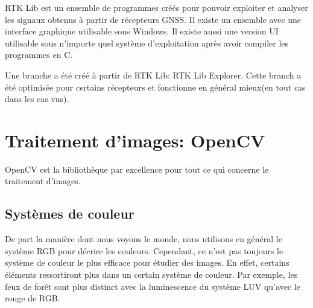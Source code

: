 \documentclass[a4paper, 11pt]{report}
\begin{document}
RTK Lib est un ensemble de programmes créés pour pouvoir exploiter et analyser les signaux obtenus à partir de récepteurs GNSS. Il existe un ensemble avec une interface graphique utilisable sous Windows. Il existe aussi une version UI utilisable sous n'importe quel système d'exploitation après avoir compiler les programmes en C.

Une branche a été créé à partir de RTK Lib: RTK Lib Explorer. Cette branch a été optimisée pour certains récepteurs et fonctionne en général mieux(en tout cas dans les cas vus).

\chapter{Traitement d'images: OpenCV}

OpenCV est la bibliothèque par excellence pour tout ce qui concerne le traitement d'images.

\section{Systèmes de couleur}
De part la manière dont nous voyons le monde, nous utilisons en général le système RGB pour décrire les couleurs. Cependant, ce n'est pas toujours le système de couleur le plus efficace pour étudier des images. En effet, certains éléments ressortiront plus dans un certain système de couleur. Par exemple, les feux de forêt sont plus distinct avec la luminescence du système LUV qu'avec le rouge de RGB.
\end{document}
